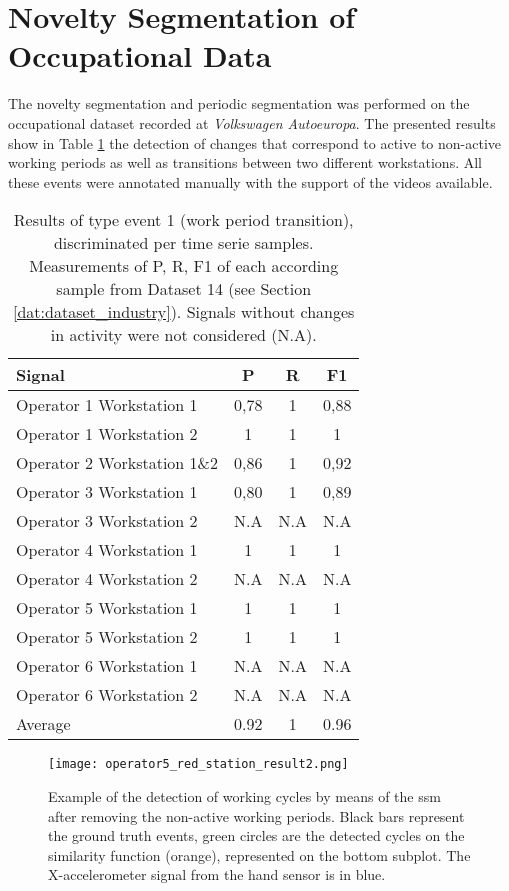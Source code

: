 \section{Novelty Segmentation of Occupational Data}
\label{append:novelty_occupational}

The novelty segmentation and periodic segmentation was performed on the occupational dataset recorded at \textit{Volkswagen Autoeuropa}. The presented results show in Table \ref{tab:auto_scores} the detection of changes that correspond to active to non-active working periods as well as transitions between two different workstations. All these events were annotated manually with the support of the videos available. 

\begin{table}
\caption{Results of type event 1 (work period transition), discriminated per time serie samples. Measurements of \gls{P}, \gls{R}, \gls{F1} of each according sample from Dataset 14 (see Section \ref{dat:dataset_industry}). Signals without changes in activity were not considered (N.A).}
\label{tab:auto_scores}
\centering
\begin{tabular}{lccc}
\toprule
Signal         & \gls{P}    & \gls{R} & \gls{F1}\\
\midrule
Operator 1 Workstation 1      & 0,78 & 1 & 0,88\\
Operator 1 Workstation 2      & 1    & 1 & 1\\
Operator 2 Workstation 1\&2 & 0,86 & 1 & 0,92\\
Operator 3 Workstation 1    & 0,80 & 1 & 0,89\\
Operator 3 Workstation 2 & N.A & N.A & N.A\\
Operator 4 Workstation 1    & 1    & 1 & 1\\
Operator 4 Workstation 2 & N.A & N.A & N.A\\
Operator 5 Workstation 1      & 1    & 1 & 1\\
Operator 5 Workstation 2      & 1    & 1 & 1\\
Operator 6 Workstation 1 & N.A & N.A & N.A\\
Operator 6 Workstation 2 & N.A & N.A & N.A\\ 
\hline
Average & 0.92 & 1 & 0.96\\
\bottomrule
\end{tabular}
\end{table}

\begin{figure}
\texttt{[image: operator5\_red\_station\_result2.png]}
\caption{Example of the detection of working cycles by means of the \gls{ssm} after removing the non-active working periods. Black bars represent the ground truth events, green circles are the detected cycles on the similarity function (orange), represented on the bottom subplot. The X-accelerometer signal from the hand sensor is in blue.}
\label{fig:example_workcycle}
\end{figure}

